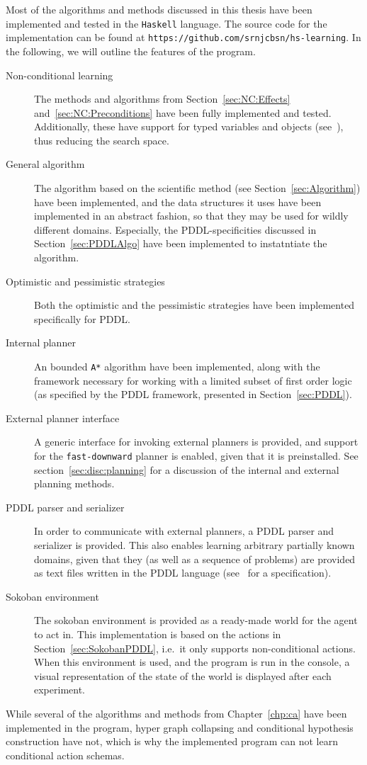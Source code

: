 \documentclass[../Master.tex]{subfiles}
\begin{document}
Most of the algorithms and methods discussed in this thesis have been implemented and tested in the \texttt{Haskell} language. The source code for the implementation can be found at \texttt{https://github.com/srnjcbsn/hs-learning}. In the following, we will outline the features of the program.

\begin{description}
    \item[Non-conditional learning] 
        The methods and algorithms from Section~\ref{sec:NC:Effects} and~\ref{sec:NC:Preconditions} have been fully implemented and tested. Additionally, these have support for typed variables and objects (see~\cite{PDDL}), thus reducing the search space.
    \item[General algorithm]
        The algorithm based on the scientific method (see Section~\ref{sec:Algorithm}) have been implemented, and the data structures it uses have been implemented in an abstract fashion, so that they may be used for wildly different domains. Especially, the PDDL-specificities discussed in Section~\ref{sec:PDDLAlgo} have been implemented to instatntiate the algorithm.
    \item[Optimistic and pessimistic strategies]
        Both the optimistic and the pessimistic strategies have been implemented specifically for PDDL.
    \item[Internal planner] An bounded \texttt{A*} algorithm have been implemented, along with the framework necessary for working with a limited subset of first order logic (as specified by the PDDL framework, presented in Section~\ref{sec:PDDL}).
    \item[External planner interface] A generic interface for invoking external planners is provided, and support for the \texttt{fast-downward} planner is enabled, given that it is preinstalled. See section~\ref{sec:disc:planning} for a discussion of the internal and external planning methods.
    \item[PDDL parser and serializer]
        In order to communicate with external planners, a PDDL parser and serializer is provided. This also enables learning arbitrary partially known domains, given that they (as well as a sequence of problems) are provided as text files written in the PDDL language (see~\cite{PDDL} for a specification).
    \item[Sokoban environment]
        The sokoban environment is provided as a ready-made world for the agent to act in. This implementation is based on the actions in Section~\ref{sec:SokobanPDDL}, i.e.\ it only supports non-conditional actions. When this environment is used, and the program is run in the console, a visual representation of the state of the world is displayed after each experiment.
\end{description}

While several of the algorithms and methods from Chapter~\ref{chp:ca} have been implemented in the program, hyper graph collapsing and conditional hypothesis construction have not, which is why the implemented program can not learn conditional action schemas.
\end{document}
